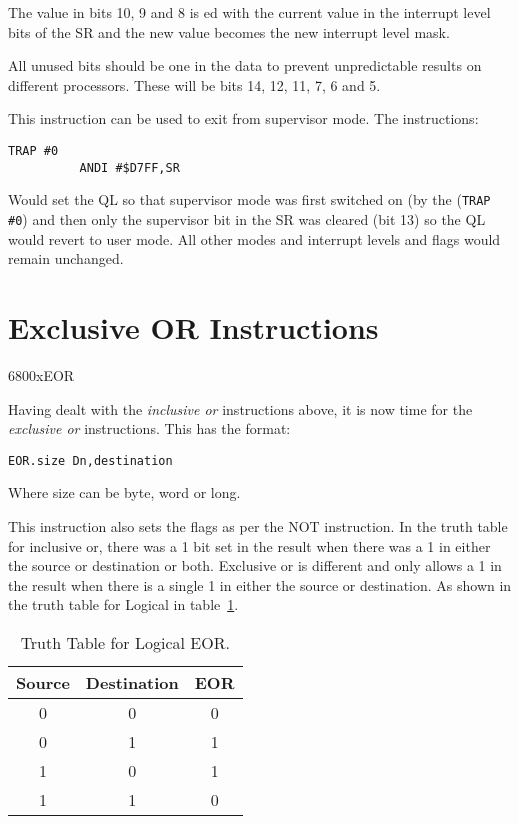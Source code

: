 The value in bits 10, 9 and 8 is ed with the current value in the
    interrupt level bits of the SR and the new value becomes the new interrupt
    level mask.

All unused bits should be one in the data to prevent unpredictable
    results on different processors. These will be bits 14, 12, 11, 7, 6 and 5.

This instruction can be used to exit from supervisor mode. The
    instructions:

\begin{lstlisting}[firstnumber=1,]
          TRAP #0
          ANDI #$D7FF,SR
\end{lstlisting}

Would set the QL so that supervisor mode was first switched on (by
    the (\lstinline{TRAP #0}) and then only the supervisor bit in the SR was cleared (bit
    13) so the QL would revert to user mode. All other modes and interrupt
    levels and flags would remain unchanged.

\section{Exclusive OR Instructions}\mc6800x{EOR}
\label{ch4-eor}%

Having dealt with the \emph{inclusive or} instructions above, it is now
    time for the \emph{exclusive or} instructions. This has the format:

\begin{lstlisting}[firstnumber=1,]
          EOR.size Dn,destination
\end{lstlisting}

Where size can be byte, word or long. 

This instruction also sets the flags as per the NOT instruction. In
    the truth table for inclusive or, there was a 1 bit set in the result when
    there was a 1 in either the source or destination or both. Exclusive or is
    different and only allows a 1 in the result when there is a single 1 in
    either the source or destination. As shown in the truth table for Logical  in table~\ref{tab:TruthTableForLogicalEOR}.

\begin{table}[h]
\centering
\begin{tabular}{cc|c}

Source & Destination & EOR\\ \hline
0 & 0 & 0 \\
0 & 1 & 1 \\
1 & 0 & 1 \\
1 & 1 & 0

\end{tabular}
\caption{Truth Table for Logical EOR.}
\label{tab:TruthTableForLogicalEOR}
\end{table}

